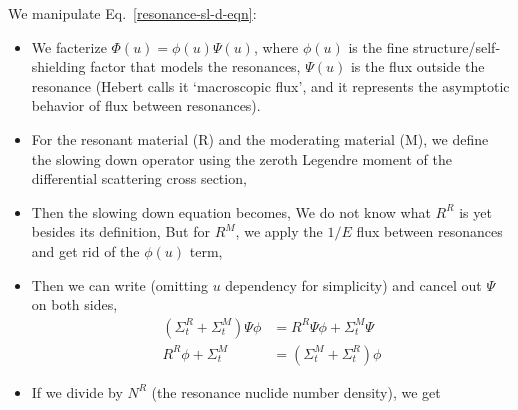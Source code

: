 \documentclass{school-22.211-notes}
\begin{document}
We manipulate Eq.~\ref{resonance-sl-d-eqn}:
\begin{itemize}
\item We facterize $\Phi(u) = \phi(u) \Psi(u)$, where $\phi(u)$ is the fine structure/self-shielding factor that models the resonances, $\Psi(u)$ is the flux outside the resonance (Hebert calls it `macroscopic flux', and it represents the asymptotic behavior of flux between resonances). 

\item For the resonant material (R) and the moderating material (M), we define the slowing down operator using the zeroth Legendre moment of the differential scattering cross section, 

\item Then the slowing down equation becomes, 
  We do not know what $R^R$ is yet besides its definition,
  But for $R^M$, we apply the $1/E$ flux between resonances and get rid of the $\phi(u)$ term, 

\item Then we can write (omitting $u$ dependency for simplicity) and cancel out $\Psi$ on both sides, 
  \begin{align}
    (\Sigma_{t}^R + \Sigma_t^M) \Psi \phi &= R^R \Psi \phi +  \Sigma_{t}^M \Psi  \\
    R^R \phi + \Sigma_t^M &= (\Sigma_t^M  + \Sigma_{t}^R ) \phi 
  \end{align}

\item If we divide by $N^R$ (the resonance nuclide number density), we get 
\end{itemize}
\end{document}
